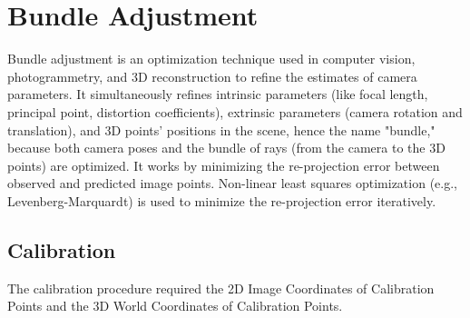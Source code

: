



\section{Bundle Adjustment}

Bundle adjustment is an optimization technique used in computer vision, photogrammetry, and 3D reconstruction to refine the estimates of camera parameters. It simultaneously refines intrinsic parameters (like focal length, principal point, distortion coefficients), extrinsic parameters (camera rotation and translation), and 3D points' positions in the scene, hence the name "bundle," because both camera poses and the bundle of rays (from the camera to the 3D points) are optimized. It works by minimizing the re-projection error between observed and predicted image points. Non-linear least squares optimization (e.g., Levenberg-Marquardt) is used to minimize the re-projection error iteratively.

\subsection{Calibration}

The calibration procedure required the 2D Image Coordinates of Calibration Points and the 3D World Coordinates of Calibration Points.

